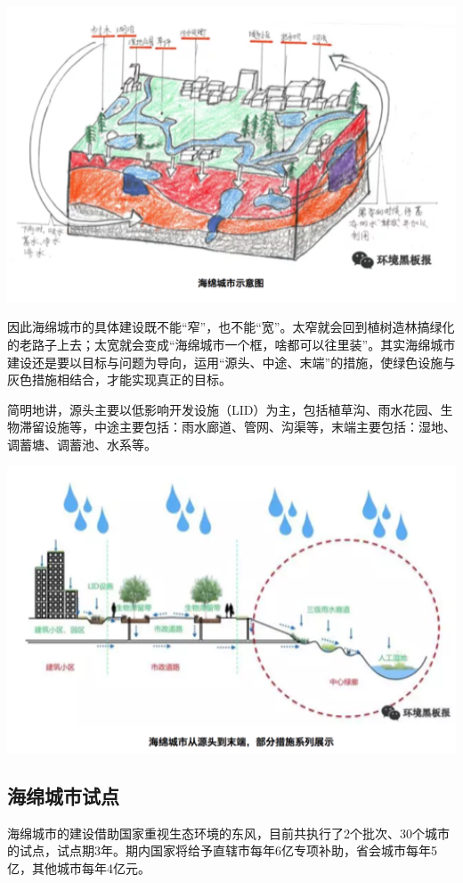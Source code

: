 \documentclass[]{book}
\begin{document}
\includegraphics[width=6.67in]{images/ch3}

因此海绵城市的具体建设既不能``窄''，也不能``宽''。太窄就会回到植树造林搞绿化的老路子上去；太宽就会变成``海绵城市一个框，啥都可以往里装''。其实海绵城市建设还是要以目标与问题为导向，运用``源头、中途、末端''的措施，使绿色设施与灰色措施相结合，才能实现真正的目标。

简明地讲，源头主要以低影响开发设施（LID）为主，包括植草沟、雨水花园、生物滞留设施等，中途主要包括：雨水廊道、管网、沟渠等，末端主要包括：湿地、调蓄塘、调蓄池、水系等。

\includegraphics[width=6.67in]{images/ch4}

\subsection{海绵城市试点}

海绵城市的建设借助国家重视生态环境的东风，目前共执行了2个批次、30个城市的试点，试点期3年。期内国家将给予直辖市每年6亿专项补助，省会城市每年5亿，其他城市每年4亿元。
\end{document}
